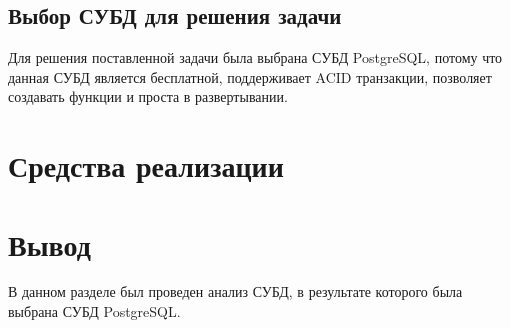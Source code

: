 \subsection{Выбор СУБД для решения задачи}
Для решения поставленной задачи была выбрана СУБД PostgreSQL, потому что данная СУБД является бесплатной, поддерживает ACID транзакции, позволяет создавать  функции и проста в развертывании.






\section{Средства реализации}


    
\section*{Вывод}

В данном разделе был проведен анализ СУБД, в результате которого была выбрана СУБД PostgreSQL.